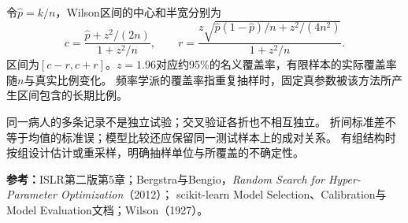令$\hat p=k/n$，Wilson区间的中心和半宽分别为
\[
 c=\frac{\hat p+z^2/(2n)}{1+z^2/n},\qquad
 r=\frac{z\sqrt{\hat p(1-\hat p)/n+z^2/(4n^2)}}{1+z^2/n}.
\]
区间为$[c-r,c+r]$。$z=1.96$对应约95\%的名义覆盖率，有限样本的实际覆盖率随$n$与真实比例变化。
频率学派的覆盖率指重复抽样时，固定真参数被该方法所产生区间包含的长期比例。

\begin{pitfall}[先确定抽样单位]
同一病人的多条记录不是独立试验；交叉验证各折也不相互独立。
折间标准差不等于均值的标准误；模型比较还应保留同一测试样本上的成对关系。
有组结构时按组设计估计或重采样，明确抽样单位与所覆盖的不确定性。
\end{pitfall}

\begingroup\small
\noindent\textbf{参考：}ISLR第二版第5章；Bergstra与Bengio，\textit{Random Search for Hyper-Parameter Optimization}（2012）；
scikit-learn Model Selection、Calibration与Model Evaluation文档；Wilson（1927）。
\par\endgroup
